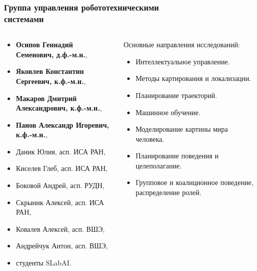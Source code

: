 \documentclass[default]{beamer}
\begin{document}
	\begin{frame}
		\frametitle{Группа управления робототехническими\\системами}
		\footnotesize
		\begin{columns}
		\begin{column}{0.5\textwidth}
		\vspace{-10pt}
		\begin{itemize}
			\item \textbf{Осипов Геннадий Семенович, д.ф.-м.н.},
			\item \textbf{Яковлев Константин Сергеевич, к.ф.-м.н.},
			\item \textbf{Макаров Дмитрий Александрович, к.ф.-м.н.},
			\item \textbf{Панов Александр Игоревич, к.ф.-м.н.},
			\item Даник Юлия, асп. ИСА РАН,
			\item Киселев Глеб, асп. ИСА РАН,
			\item Боковой Андрей, асп. РУДН,
			\item Скрыник Алексей, асп. ИСА РАН,
			\item Ковалев Алексей, асп. ВШЭ,
			\item Андрейчук Антон, асп. ВШЭ,
			\item студенты SLabAI.
		\end{itemize}
		\end{column}
		\begin{column}{0.5\textwidth}
		Основные направления исследований:
		\begin{itemize}
			\item Интеллектуальное управление.
			\item Методы картирования и локализации.
			\item Планирование траекторий.
			\item Машинное обучение.
			\item Моделирование картины мира человека.
			\item Планирование поведения и целеполагание.
			\item Групповое и коалиционное поведение, распределение ролей.
		\end{itemize}
		\end{column}
		\end{columns}		
	\end{frame}	
\end{document}

